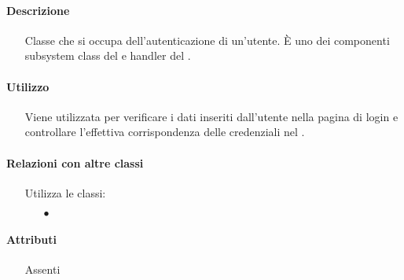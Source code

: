 \paragraph*{Descrizione}
\begin{itemize}
\item[] Classe che si occupa dell'autenticazione di un'utente. È uno dei componenti subsystem class del   e handler del  .
\end{itemize}

\paragraph*{Utilizzo}
\begin{itemize}
\item[] Viene utilizzata per verificare i dati inseriti dall'utente nella pagina di login e controllare l'effettiva corrispondenza delle credenziali nel .
\end{itemize}

\paragraph*{Relazioni con altre classi}
\begin{itemize}


\item[] Utilizza le classi:
\begin{itemize}
\item[$\bullet$] 
\end{itemize}
\end{itemize}

\paragraph*{Attributi}
\begin{itemize}
\item[] Assenti
\end{itemize}

